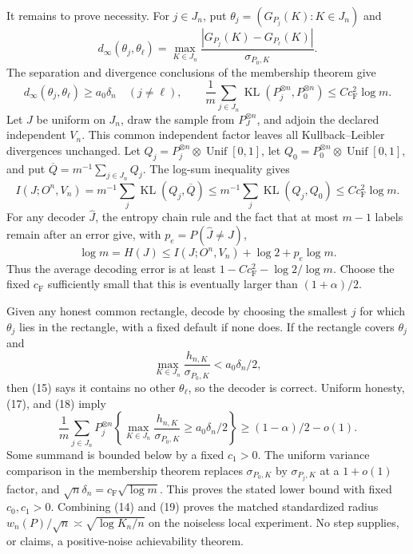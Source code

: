 It remains to prove necessity.  For \(j\in J_n\), put \(\theta_j=(G_{P_j}(K):K\in J_n)\) and
\[
 d_\infty(\theta_j,\theta_\ell)=
 \max_{K\in J_n}\frac{|G_{P_j}(K)-G_{P_\ell}(K)|}{\sigma_{P_0,K}}.
\]
The separation and divergence conclusions of the membership theorem give
\[
 d_\infty(\theta_j,\theta_\ell)\geq a_0\delta_n\quad(j\neq\ell),
 \qquad
 \frac1m\sum_{j\in J_n}\operatorname{KL}(P_j^{\otimes n},P_0^{\otimes n})
 \leq Cc_{\mathrm F}^2\log m.                                               \tag{15}
\]
Let \(J\) be uniform on \(J_n\), draw the sample from \(P_J^{\otimes n}\), and adjoin the declared independent \(V_n\).  This common independent factor leaves all Kullback--Leibler divergences unchanged.  Let \(Q_j=P_j^{\otimes n}\otimes\operatorname{Unif}[0,1]\), let \(Q_0=P_0^{\otimes n}\otimes\operatorname{Unif}[0,1]\), and put \(\overline Q=m^{-1}\sum_{j\in J_n}Q_j\).  The log-sum inequality gives
\[
 I(J;O^n,V_n)=m^{-1}\sum_j\operatorname{KL}(Q_j,\overline Q)
 \leq m^{-1}\sum_j\operatorname{KL}(Q_j,Q_0)
 \leq Cc_{\mathrm F}^2\log m.                                               \tag{16}
\]
For any decoder \(\widehat J\), the entropy chain rule and the fact that at most \(m-1\) labels remain after an error give, with \(p_e=P(\widehat J\neq J)\),
\[
 \log m=H(J)\leq I(J;O^n,V_n)+\log2+p_e\log m.                              \tag{17}
\]
Thus the average decoding error is at least \(1-Cc_{\mathrm F}^2-\log2/\log m\).  Choose the fixed \(c_{\mathrm F}\) sufficiently small that this is eventually larger than \((1+\alpha)/2\).

Given any honest common rectangle, decode by choosing the smallest \(j\) for which \(\theta_j\) lies in the rectangle, with a fixed default if none does.  If the rectangle covers \(\theta_j\) and
\[
 \max_{K\in J_n}\frac{h_{n,K}}{\sigma_{P_0,K}}<a_0\delta_n/2,              \tag{18}
\]
then (15) says it contains no other \(\theta_\ell\), so the decoder is correct.  Uniform honesty, (17), and (18) imply
\[
 \frac1m\sum_{j\in J_n}P_j^{\otimes n}\!\left\{
 \max_{K\in J_n}\frac{h_{n,K}}{\sigma_{P_0,K}}
 \geq a_0\delta_n/2\right\}
 \geq(1-\alpha)/2-o(1).                                                      \tag{19}
\]
Some summand is bounded below by a fixed \(c_1>0\).  The uniform variance comparison in the membership theorem replaces \(\sigma_{P_0,K}\) by \(\sigma_{P_j,K}\) at a \(1+o(1)\) factor, and \(\sqrt n\delta_n=c_{\mathrm F}\sqrt{\log m}\).  This proves the stated lower bound with fixed \(c_0,c_1>0\).  Combining (14) and (19) proves the matched standardized radius \(w_n(P)/\sqrt n\asymp\sqrt{\log K_n/n}\) on the noiseless local experiment.  No step supplies, or claims, a positive-noise achievability theorem.
